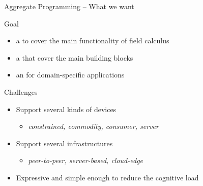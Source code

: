 \documentclass[presentation, 9pt]{beamer}\mode<presentation>{\usetheme{AMSBolognaFC}}
\begin{document}
\begin{frame}{Aggregate Programming -- What we want}
	\begin{exampleblock}{Goal}
		\begin{itemize}
			\item a  to cover the main functionality of field calculus
			\item a  that cover the main building blocks
			\item an  for domain-specific applications
		\end{itemize}
	\end{exampleblock}
	\begin{exampleblock}{Challenges}
		\begin{itemize}
			\item Support several kinds of devices
			\begin{itemize}
				\item \emph{constrained, commodity, consumer, server}
			\end{itemize}
			\item Support several infrastructures
			\begin{itemize}
				\item \emph{peer-to-peer, server-based, cloud-edge} %
			\end{itemize}
			\item Expressive and simple enough to reduce the cognitive load
		\end{itemize}
	\end{exampleblock}
\end{frame}
\end{document}
